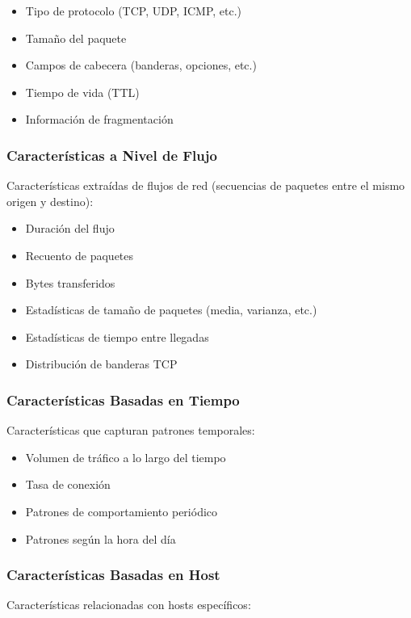 \begin{itemize}
    \item Tipo de protocolo (TCP, UDP, ICMP, etc.)
    \item Tamaño del paquete
    \item Campos de cabecera (banderas, opciones, etc.)
    \item Tiempo de vida (TTL)
    \item Información de fragmentación
\end{itemize}

\subsubsection{Características a Nivel de Flujo}
Características extraídas de flujos de red (secuencias de paquetes entre el mismo origen y destino):

\begin{itemize}
    \item Duración del flujo
    \item Recuento de paquetes
    \item Bytes transferidos
    \item Estadísticas de tamaño de paquetes (media, varianza, etc.)
    \item Estadísticas de tiempo entre llegadas
    \item Distribución de banderas TCP
\end{itemize}

\subsubsection{Características Basadas en Tiempo}
Características que capturan patrones temporales:

\begin{itemize}
    \item Volumen de tráfico a lo largo del tiempo
    \item Tasa de conexión
    \item Patrones de comportamiento periódico
    \item Patrones según la hora del día
\end{itemize}

\subsubsection{Características Basadas en Host}
Características relacionadas con hosts específicos:

